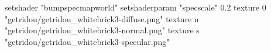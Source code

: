 setshader "bumpspecmapworld"
setshaderparam "specscale" 0.2
texture 0 "getridou/getridou_whitebrick3-diffuse.png"
texture n "getridou/getridou_whitebrick3-normal.png"
texture s "getridou/getridou_whitebrick3-specular.png"


